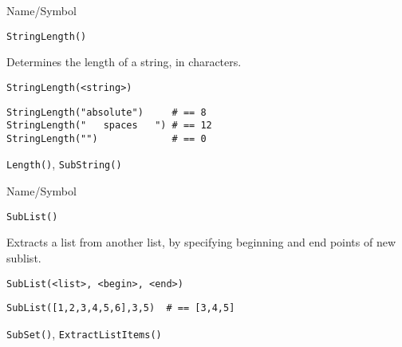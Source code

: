 \rl


\begin{desc}{Name/Symbol}
\item[Name/Symbol]  	\verb+StringLength()+

\item[Description] 	Determines the length of a string, in characters.

\item[Usage]
\begin{verbatim}
StringLength(<string>)
\end{verbatim}

\item[Example]     	
\begin{verbatim}
StringLength("absolute")     # == 8
StringLength("   spaces   ") # == 12
StringLength("")             # == 0
\end{verbatim}

\item[See Also]    	\verb+Length()+, \verb+SubString()+
\end{desc}

\rl


\begin{desc}{Name/Symbol}
\item[Name/Symbol]  	\verb+SubList()+

\item[Description] 	Extracts a list from another list, by specifying 
	     	beginning and end points of new sublist.

\item[Usage]
\begin{verbatim}
SubList(<list>, <begin>, <end>)
\end{verbatim}

\item[Example]     	
\begin{verbatim}
SubList([1,2,3,4,5,6],3,5)	# == [3,4,5]
\end{verbatim}

\item[See Also]    	\verb+SubSet()+, \verb+ExtractListItems()+
\end{desc}

\rl


